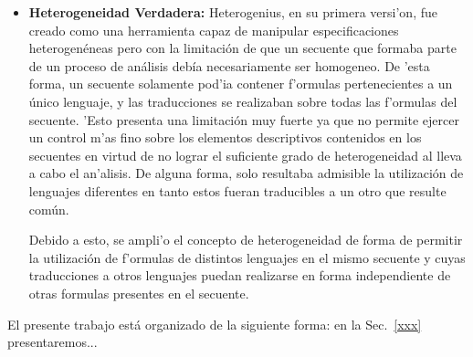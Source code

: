 \begin{itemize}
\item \textbf{Heterogeneidad Verdadera:} Heterogenius, en su primera versi'on, fue creado como una herramienta capaz de manipular especificaciones heterogenéneas pero con la limitación de que un secuente que formaba parte de un proceso de análisis debía necesariamente ser homogeneo. De 'esta forma, un secuente solamente pod'ia contener f'ormulas pertenecientes a un único lenguaje, y las traducciones se realizaban sobre todas las f'ormulas del secuente. 'Esto presenta una limitación muy fuerte ya que no permite ejercer un control m'as fino sobre los elementos descriptivos contenidos en los secuentes en virtud de no lograr el suficiente grado de heterogeneidad al lleva a cabo el an'alisis. De alguna forma, solo resultaba admisible la utilización de lenguajes diferentes en tanto estos fueran traducibles a un otro que resulte común.

Debido a esto, se ampli'o el concepto de heterogeneidad de forma de permitir la utilización de f'ormulas de distintos lenguajes en el mismo secuente y cuyas traducciones a otros lenguajes puedan realizarse en forma independiente de otras formulas presentes en el secuente.
\end{itemize}

El presente trabajo está organizado de la siguiente forma: en la Sec.~\ref{xxx} presentaremos...